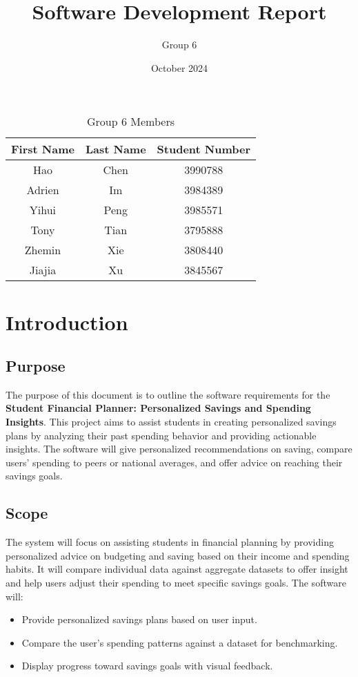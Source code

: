 \documentclass{article}
\title{Software Development Report}
\author{Group 6}
\date{October 2024}
\begin{document}
\maketitle

\begin{table}[ht]
    \centering
    \begin{tabular}{ccc} 
    \toprule
    \textbf{First Name} & \textbf{Last Name} & \textbf{Student Number} \\ 
    \midrule
    Hao    & Chen     & 3990788 \\ 
    Adrien & Im       & 3984389 \\
    Yihui  & Peng     & 3985571 \\ 
    Tony   & Tian     & 3795888 \\ 
    Zhemin & Xie      & 3808440 \\ 
    Jiajia & Xu       & 3845567 \\ 
    \bottomrule
    \end{tabular}
    \caption{Group 6 Members}
    \label{tab:group6_members}
\end{table}

\section{Introduction}
\subsection{Purpose}
The purpose of this document is to outline the software requirements for the \textbf{Student Financial Planner: Personalized Savings and Spending Insights}. This project aims to assist students in creating personalized savings plans by analyzing their past spending behavior and providing actionable insights. The software will give personalized recommendations on saving, compare users' spending to peers or national averages, and offer advice on reaching their savings goals.

\subsection{Scope}
The system will focus on assisting students in financial planning by providing personalized advice on budgeting and saving based on their income and spending habits. It will compare individual data against aggregate datasets to offer insight and help users adjust their spending to meet specific savings goals. The software will:
\begin{itemize}
    \item Provide personalized savings plans based on user input.
    \item Compare the user's spending patterns against a dataset for benchmarking.
    \item Display progress toward savings goals with visual feedback.
\end{itemize}
\end{document}
